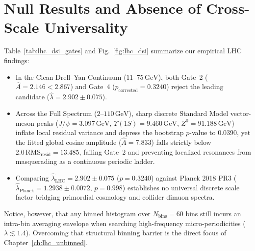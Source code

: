 \section{Null Results and Absence of Cross-Scale Universality}
Table~\ref{tab:lhc_dsi_gates} and Fig.~\ref{fig:lhc_dsi} summarize our empirical LHC findings:
\begin{itemize}
    \item In the Clean Drell--Yan Continuum ($11\text{--}75\,\mathrm{GeV}$), both Gate~2 ($\hat A = 2.146 < 2.867$) and Gate~4 ($p_{\mathrm{corrected}} = 0.3240$) reject the leading candidate ($\hat\lambda = 2.902 \pm 0.075$).
    \item Across the Full Spectrum ($2\text{--}110\,\mathrm{GeV}$), sharp discrete Standard Model vector-meson peaks ($J/\psi = 3.097\,\mathrm{GeV}$, $\Upsilon(1S) = 9.460\,\mathrm{GeV}$, $Z^0 = 91.188\,\mathrm{GeV}$) inflate local residual variance and depress the bootstrap $p$-value to $0.0390$, yet the fitted global cosine amplitude ($\hat A = 7.833$) falls strictly below $2.0\,\mathrm{RMS}_{\mathrm{resid}} = 13.485$, failing Gate~2 and preventing localized resonances from masquerading as a continuous periodic ladder.
    \item Comparing $\hat\lambda_{\mathrm{LHC}} = 2.902 \pm 0.075$ ($p = 0.3240$) against Planck 2018 PR3 ($\hat\lambda_{\mathrm{Planck}} = 1.2938 \pm 0.0072$, $p = 0.998$) establishes no universal discrete scale factor bridging primordial cosmology and collider dimuon spectra.
\end{itemize}
Notice, however, that any binned histogram over $N_{\mathrm{bins}} = 60$ bins still incurs an intra-bin averaging envelope when searching high-frequency micro-periodicities ($\lambda \lesssim 1.4$). Overcoming that structural binning barrier is the direct focus of Chapter~\ref{ch:lhc_unbinned}.

